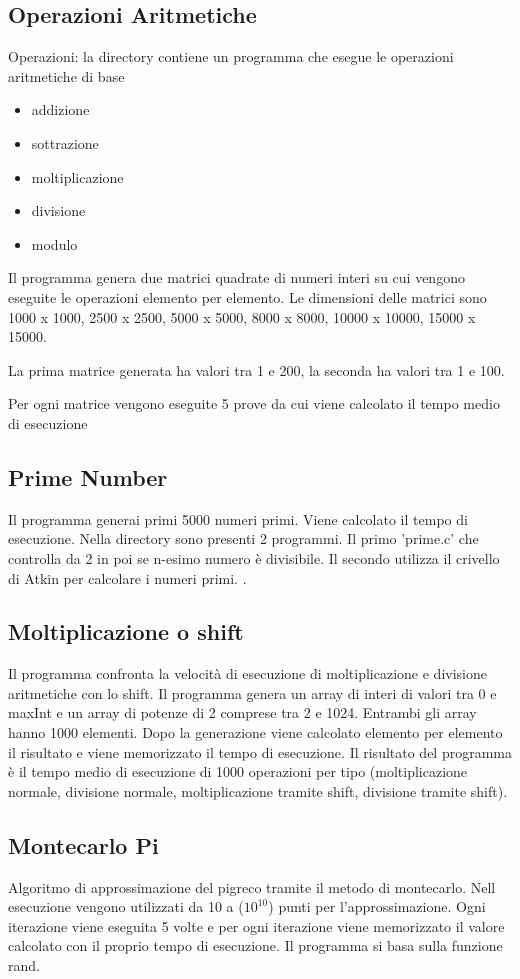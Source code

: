 \documentclass[12pt,a4paper]{report}
\begin{document}
\subsection{Operazioni Aritmetiche}
Operazioni: la directory contiene un programma che esegue le operazioni aritmetiche di base 
\begin{itemize}
	\item addizione
	\item sottrazione
	\item moltiplicazione
	\item divisione
	\item modulo
\end{itemize} 
Il programma genera due matrici quadrate di numeri interi su cui vengono eseguite le operazioni elemento per elemento. Le dimensioni delle matrici sono 1000 x 1000, 2500 x 2500, 5000 x 5000, 8000 x 8000, 10000 x 10000, 15000 x 15000.

La prima matrice generata ha valori tra 1 e 200, la seconda ha valori tra 1 e 100.

Per ogni matrice vengono eseguite 5 prove da cui viene calcolato il tempo medio di esecuzione

\subsection{Prime Number}
Il programma generai primi 5000 numeri primi. Viene calcolato il tempo di esecuzione. Nella directory sono presenti 2 programmi. Il primo 'prime.c' che controlla da 2 in poi se n-esimo numero è divisibile. 
Il secondo utilizza il crivello di Atkin per calcolare i numeri primi. .

\subsection{Moltiplicazione o shift}
Il programma confronta la velocità di esecuzione di moltiplicazione e divisione aritmetiche con lo shift. Il programma genera un array di interi di valori tra 0 e maxInt e un array di potenze di 2 comprese tra 2 e 1024. Entrambi gli array hanno 1000 elementi. Dopo la generazione viene calcolato elemento per elemento il risultato e viene memorizzato il tempo di esecuzione. Il risultato del programma è il tempo medio di esecuzione di 1000 operazioni per tipo (moltiplicazione normale, divisione normale, moltiplicazione tramite shift, divisione tramite shift).

\subsection{Montecarlo Pi}
Algoritmo di approssimazione del pigreco tramite il metodo di montecarlo. Nell esecuzione vengono utilizzati da 10 a ($ 10^{10} $) punti per l'approssimazione. Ogni iterazione viene eseguita 5 volte e per ogni iterazione viene memorizzato il valore calcolato con il proprio tempo di esecuzione. Il programma si basa sulla funzione rand.
\end{document}
